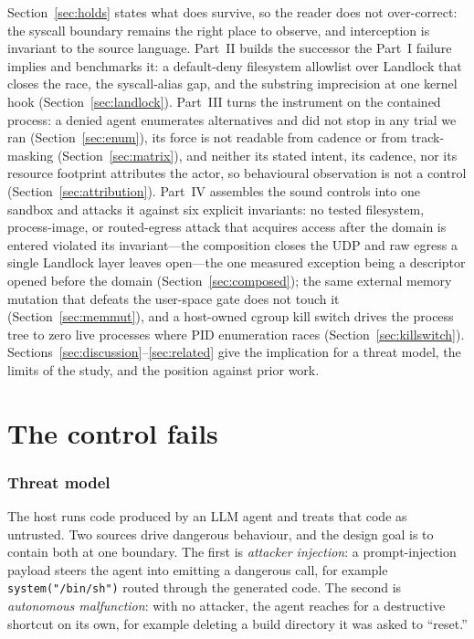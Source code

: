 \documentclass[11pt]{article}
\begin{document}
Section~\ref{sec:holds} states what does survive, so the reader does not over-correct: the
syscall boundary remains the right place to observe, and interception is invariant to the
source language. Part~II builds the successor the Part~I failure implies and benchmarks it: a
default-deny filesystem allowlist over Landlock that closes the race, the syscall-alias gap, and the
substring imprecision at one kernel hook (Section~\ref{sec:landlock}). Part~III turns the instrument on
the contained process: a denied agent enumerates alternatives and did not stop in any trial we ran
(Section~\ref{sec:enum}),
its force is not readable from cadence or from track-masking (Section~\ref{sec:matrix}), and neither its
stated intent, its cadence, nor its resource footprint attributes the actor, so behavioural observation is
not a control (Section~\ref{sec:attribution}). Part~IV assembles the sound controls into one sandbox and attacks
it against six explicit invariants: no tested filesystem, process-image, or routed-egress attack that acquires
access after the domain is entered violated its invariant---the composition closes the UDP and raw egress a
single Landlock layer leaves open---the one measured exception being a descriptor opened before the domain
(Section~\ref{sec:composed}); the same external memory mutation that defeats the user-space gate does
not touch it (Section~\ref{sec:memmut}), and a host-owned cgroup kill switch drives the process tree to
zero live processes where PID enumeration races (Section~\ref{sec:killswitch}).
Sections~\ref{sec:discussion}--\ref{sec:related} give the
implication for a threat model, the limits of the study, and the position against prior work.

\part{The control fails}

\section{Threat model}\label{sec:threat}

The host runs code produced by an LLM agent and treats that code as untrusted. Two sources
drive dangerous behaviour, and the design goal is to contain both at one boundary. The first
is \emph{attacker injection}: a prompt-injection payload steers the agent into emitting a
dangerous call, for example \texttt{system("/bin/sh")} routed through the generated code. The
second is \emph{autonomous malfunction}: with no attacker, the agent reaches for a
destructive shortcut on its own, for example deleting a build directory it was asked to
``reset.''
\end{document}
